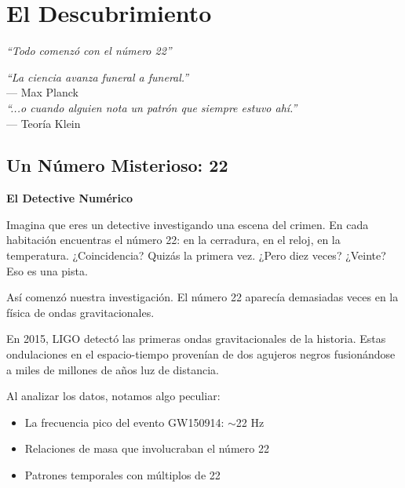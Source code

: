 \chapter{El Descubrimiento}
\label{cap:descubrimiento}

\begin{center}
\textit{``Todo comenzó con el número 22''}
\end{center}

\vspace{0.5cm}

\begin{tcolorbox}[colback=white, colframe=kleinblue, boxrule=2pt]
\centering
\textit{``La ciencia avanza funeral a funeral.''}\\
--- Max Planck\\[0.3cm]
\textit{``...o cuando alguien nota un patrón que siempre estuvo ahí.''}\\
--- Teoría Klein
\end{tcolorbox}


\section{Un Número Misterioso: 22}

\begin{analogiabox}
\textbf{El Detective Numérico}

Imagina que eres un detective investigando una escena del crimen.
En cada habitación encuentras el número 22: en la cerradura, en el
reloj, en la temperatura. ¿Coincidencia? Quizás la primera vez.
¿Pero diez veces? ¿Veinte? Eso es una pista.

Así comenzó nuestra investigación. El número 22 aparecía
demasiadas veces en la física de ondas gravitacionales.
\end{analogiabox}

En 2015, LIGO detectó las primeras ondas gravitacionales de la historia.
Estas ondulaciones en el espacio-tiempo provenían de dos agujeros negros
fusionándose a miles de millones de años luz de distancia.

Al analizar los datos, notamos algo peculiar:

\begin{itemize}
    \item La frecuencia pico del evento GW150914: $\sim$22 Hz
    \item Relaciones de masa que involucraban el número 22
    \item Patrones temporales con múltiplos de 22
\end{itemize}

